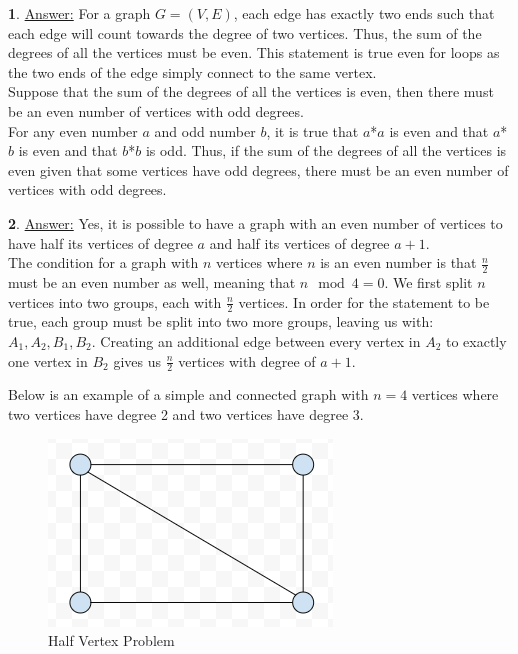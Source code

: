 \documentclass[12pt,a4paper]{article}
\theoremstyle{definition}
\newtheorem{problem}{}
\begin{document}
\begin{problem}
\underline{Answer:} For a graph $G = (V, E)$, each edge has exactly two ends such that each edge will count towards the degree of two vertices. Thus, the sum of the degrees of all the vertices must be even. This statement is true even for loops as the two ends of the edge simply connect to the same vertex. \\

Suppose that the sum of the degrees of all the vertices is even, then there must be an even number of vertices with odd degrees. \\

For any even number $a$ and odd number $b$, it is true that $a$*$a$ is even and that $a$*$b$ is even and that $b$*$b$ is odd. Thus, if the sum of the degrees of all the vertices is even given that some vertices have odd degrees, there must be an even number of vertices with odd degrees.

\end{problem}

\begin{problem}
\underline{Answer:} Yes, it is possible to have a graph with an even number of vertices to have half its vertices of degree $a$ and half its vertices of degree $a + 1$. \\

The condition for a graph with $n$ vertices where $n$ is an even number is that $\frac{n}{2}$ must be an even number as well, meaning that $n \mod 4 = 0$. We first split $n$ vertices into two groups, each with $\frac{n}{2}$ vertices. In order for the statement to be true, each group must be split into two more groups, leaving us with: $A_1, A_2, B_1, B_2$. Creating an additional edge between every vertex in $A_2$ to exactly one vertex in $B_2$ gives us $\frac{n}{2}$ vertices with degree of $a + 1$.

Below is an example of a simple and connected graph with $n = 4$ vertices where two vertices have degree 2 and two vertices have degree 3. \\

\begin{figure}[H]
    \centering
    \includegraphics[scale=0.6]{q3.png}
    \caption{Half Vertex Problem}
    \label{fig:my_label}
\end{figure}

\end{problem}
\end{document}
